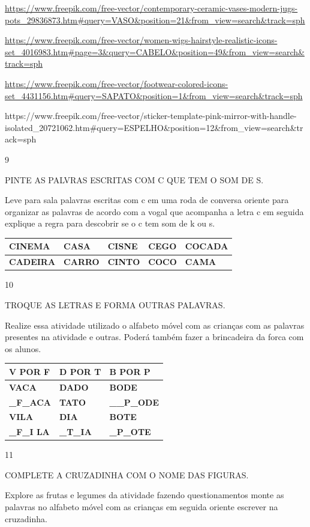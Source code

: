 {\url{https://www.freepik.com/free-vector/contemporary-ceramic-vases-modern-jugs-pots_29836873.htm\#query=VASO\&position=21\&from_view=search\&track=sph}

\url{https://www.freepik.com/free-vector/women-wigs-hairstyle-realistic-icons-set_4016983.htm\#page=3\&query=CABELO\&position=49\&from_view=search\&track=sph}

\url{https://www.freepik.com/free-vector/footwear-colored-icons-set_4431156.htm\#query=SAPATO\&position=1\&from_view=search\&track=sph}

https://www.freepik.com/free-vector/sticker-template-pink-mirror-with-handle-isolated\_20721062.htm\#query=ESPELHO\&position=12\&from\_view=search\&track=sph

\num{9}

PINTE AS PALVRAS ESCRITAS COM C QUE TEM O SOM DE S.

Leve para sala palavras escritas com c em uma roda de conversa oriente
para organizar as palavras de acordo com a vogal que acompanha a letra c
em seguida explique a regra para descobrir se o c tem som de k ou s.

\begin{longtable}[]{@{}lllll@{}}
\toprule
\textbf{CINEMA} & \textbf{CASA} & \textbf{CISNE} & \textbf{CEGO} &
\textbf{COCADA}\tabularnewline
\midrule
\endhead
\textbf{CADEIRA} & \textbf{CARRO} & \textbf{CINTO } & \textbf{COCO} &
\textbf{CAMA}\tabularnewline
\bottomrule
\end{longtable}

\num{10}

TROQUE AS LETRAS E FORMA OUTRAS PALAVRAS.

Realize essa atividade utilizado o alfabeto móvel com as crianças com as
palavras presentes na atividade e outras. Poderá também fazer a
brincadeira da forca com os alunos.

\begin{longtable}[]{@{}lll@{}}
\toprule
\textbf{V POR F} & \textbf{D POR T} & \textbf{B POR P}\tabularnewline
\midrule
\endhead
\textbf{VACA} & \textbf{DADO} & \textbf{BODE}\tabularnewline
\textbf{\_F\_ACA} & \textbf{TATO} & \textbf{\_\_P\_ODE}\tabularnewline
\textbf{VILA} & \textbf{DIA} & \textbf{BOTE}\tabularnewline
\textbf{\_F\_I LA} & \textbf{\_T\_IA} & \textbf{\_P\_OTE}\tabularnewline
\bottomrule
\end{longtable}

\num{11}

COMPLETE A CRUZADINHA COM O NOME DAS FIGURAS.

Explore as frutas e legumes da atividade fazendo questionamentos monte
as palavras no alfabeto móvel com as crianças em seguida oriente
escrever na cruzadinha.

}
